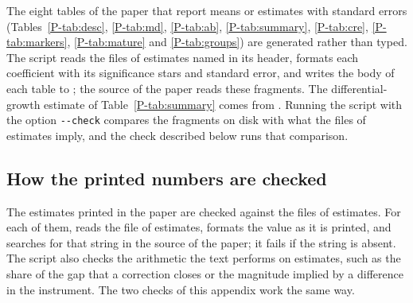 The eight tables of the paper that report means or estimates with standard errors
(Tables~\ref{P-tab:desc}, \ref{P-tab:md}, \ref{P-tab:ab}, \ref{P-tab:summary},
\ref{P-tab:cre}, \ref{P-tab:markers},
\ref{P-tab:mature} and \ref{P-tab:groups}) are generated rather than typed. The script
 reads the files of estimates
named in its header, formats each coefficient with its significance stars
and standard error, and writes the body of each table to
; the source of the paper reads these fragments. The
differential-growth estimate of Table~\ref{P-tab:summary} comes from
. Running the script with
the option \texttt{-{}-check} compares the fragments on disk with what the files of
estimates imply, and the check described below runs that comparison.

\subsection{How the printed numbers are checked}

The estimates printed in the paper are checked against the files of estimates. For each of them,
 reads the file of estimates,
formats the value as it is printed, and searches for that string in the
source of the paper; it fails if the string is absent. The script also
checks the arithmetic the text performs on estimates, such as the share
of the gap that a correction closes or the magnitude implied by a
difference in the instrument. The two checks of this appendix work the
same way.
